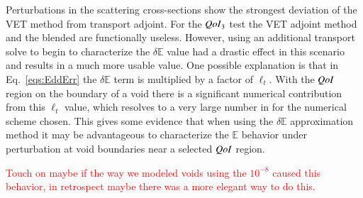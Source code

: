 \documentclass{anstrans}
\newcommand{\Edd}{\mathbb{E}}
\newcommand{\isigt}{\ell_t}
\newcommand{\qoi}{{\it QoI}\xspace}
\newcommand{\tcr}[1]{\textcolor{red}{#1}}
\begin{document}
Perturbations in the scattering cross-sections show the strongest deviation of  the VET method from transport adjoint. For the $\qoi_3$ test the VET adjoint method and the blended are functionally useless. However, using an additional transport solve to begin to characterize the $\delta \Edd$ value had a drastic effect in this scenario and results in a much more usable value. One possible explanation is that in Eq.~\eqref{eqs:EddErr} the $\delta \Edd$ term is multiplied by a factor of $\isigt$. With the $\qoi$ region on the boundary of a void there is a significant numerical contribution from this $\isigt$ value, which resolves to a very large number in for the numerical scheme chosen. This gives some evidence that when using the $\delta \Edd$ approximation method it may be advantageous to characterize the $\Edd$ behavior under perturbation at void boundaries near a selected $\qoi$ region.

\tcr{Touch on maybe if the way we modeled voids using the $10^{-8}$ caused this behavior, in retrospect maybe there was a more elegant way to do this.}

\appendix
\end{document}
